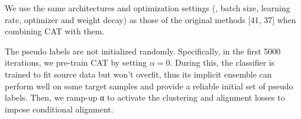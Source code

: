 \documentclass[10pt,twocolumn,letterpaper]{article}
\begin{document}
We use the same architectures and optimization settings (\eg, batch size, learning rate, optimizer and weight decay) as those of the original methods [41, 37] when combining CAT with them.

The pseudo labels are not initialized randomly. Specifically, in the first 5000 iterations, we pre-train CAT by setting $\alpha = 0$. During this, the classifier is trained to fit source data but won't overfit, thus its implicit ensemble can perform well on some target samples and provide a reliable initial set of pseudo labels. Then, we ramp-up α to activate the clustering and alignment losses to impose conditional alignment.
\end{document}
